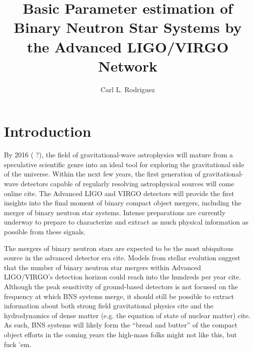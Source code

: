 \documentclass{emulateapj}
\newcommand{\carl}[1]{{\color{red}  #1}}
\begin{document}
\title{Basic Parameter estimation of Binary Neutron Star Systems by the Advanced LIGO/VIRGO Network}
\author{Carl L. Rodriguez}

\begin{abstract}
\end{abstract}

\maketitle
\section{Introduction}

 By 2016 (\carl{?}), the field of gravitational-wave astrophysics will mature from a speculative scientific genre into an ideal tool for exploring the gravitational side of the universe.
 Within the next few years, the first generation of gravitational-wave detectors capable of regularly resolving astrophysical sources will come online \carl{cite}.   The Advanced LIGO and VIRGO detectors will provide  the first insights into the final moment of binary compact object mergers, including the merger of binary neutron star systems.  Intense preparations are currently underway to prepare to characterize and extract as much physical information as possible from these signals.
 
The mergers of binary neutron stars are expected to be the most ubiquitous source in the advanced detector era \carl{cite}.   Models from stellar evolution suggest that the number of binary neutron star mergers within Advanced LIGO/VIRGO's detection horizon could reach into the hundreds per year \carl{cite}.  Although the peak sensitivity of ground-based detectors is not focused on the frequency at which BNS systems merge, it should still be possible to extract information about both strong field gravitational physics \carl{cite} and the hydrodynamics of dense matter (e.g. the equation of state of nuclear matter) \carl{cite}.  As such, BNS systems will likely form the ``bread and butter'' of the compact object efforts in the coming years \carl{the high-mass folks might not like this, but fuck 'em}.
\end{document}
